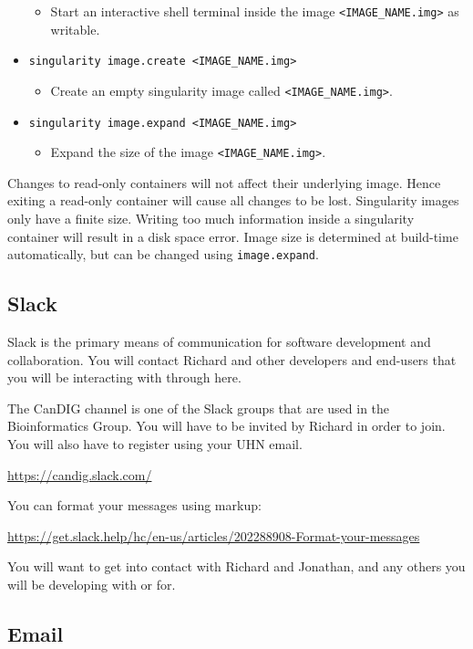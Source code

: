 \documentclass{article}
\begin{document}
\begin{itemize}
\begin{itemize}
    \item Start an interactive shell terminal inside the image \texttt{<IMAGE\_NAME.img>} as writable.
    \end{itemize}
\item \texttt{singularity image.create <IMAGE\_NAME.img>}
    \begin{itemize}
    \item Create an empty singularity image called \texttt{<IMAGE\_NAME.img>}.
    \end{itemize}
\item \texttt{singularity image.expand <IMAGE\_NAME.img>}
    \begin{itemize}
    \item Expand the size of the image \texttt{<IMAGE\_NAME.img>}.
    \end{itemize}
\end{itemize}

Changes to read-only containers will not affect their underlying image.
Hence exiting a read-only container will cause all changes to be lost.
Singularity images only have a finite size. Writing too much information
inside a singularity container will result in a disk space error.
Image size is determined at build-time automatically, but can be
changed using \texttt{image.expand}.

\subsection{Slack}

Slack is the primary means of communication for software development
and collaboration.
You will contact Richard and other developers and end-users that 
you will be interacting with through here.

The CanDIG channel is one of the Slack groups 
that are used in the Bioinformatics Group. You will
have to be invited by Richard in order to join.
You will also have to register using your UHN email.

\url{https://candig.slack.com/}

You can format your messages using markup:

\url{https://get.slack.help/hc/en-us/articles/202288908-Format-your-messages}

You will want to get into contact with Richard and Jonathan, 
and any others you will be developing with or for.

\subsection{Email}
\end{document}
